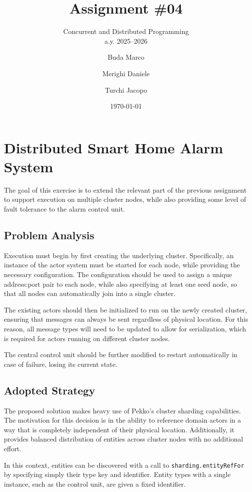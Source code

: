 \documentclass{scrartcl}
\title{\LARGE
Assignment \#04
}
\subtitle{Concurrent and Distributed Programming\\a.y. 2025--2026}
\author{
    Buda Marco \and Merighi Daniele \and Turchi Jacopo
}
\date{\today}
\begin{document}
\maketitle

\section{Distributed Smart Home Alarm System}

The goal of this exercise is to extend the relevant part of the previous assignment to support execution on multiple cluster nodes, while also providing some level of fault tolerance to the alarm control unit.

\subsection{Problem Analysis}

Execution must begin by first creating the underlying cluster. Specifically, an instance of the actor system must be started for each node, while providing the necessary configuration. The configuration should be used to assign a unique address:port pair to each node, while also specifying at least one seed node, so that all nodes can automatically join into a single cluster.

The existing actors should then be initialized to run on the newly created cluster, ensuring that messages can always be sent regardless of physical location. For this reason, all message types will need to be updated to allow for serialization, which is required for actors running on different cluster nodes.

The central control unit should be further modified to restart automatically in case of failure, losing its current state.

\subsection{Adopted Strategy}

The proposed solution makes heavy use of Pekko's cluster sharding capabilities. The motivation for this decision is in the ability to reference domain actors in a way that is completely independent of their physical location. Additionally, it provides balanced distribution of entities across cluster nodes with no additional effort.

In this context, entities can be discovered with a call to \texttt{sharding.entityRefFor} by specifying simply their type key and identifier. Entity types with a single instance, such as the control unit, are given a fixed identifier.
\end{document}
